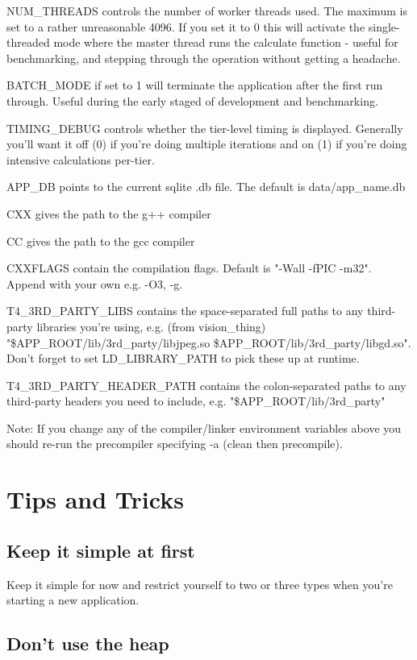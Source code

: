 \documentclass{report}
\begin{document}
NUM_THREADS controls the number of worker threads used. The maximum is set to a rather unreasonable 4096. If you set it to 0 this will activate the single-threaded mode where the master thread runs the calculate function - useful for benchmarking, and stepping through the operation without getting a headache.

BATCH_MODE if set to 1 will terminate the application after the first run through. Useful during the early staged of development and benchmarking.

TIMING_DEBUG controls whether the tier-level timing is displayed. Generally you'll want it off  (0) if you're doing multiple iterations and on (1) if you're doing intensive calculations per-tier.

APP_DB points to the current sqlite .db file. The default is data/app_name.db

CXX gives the path to the g++ compiler

CC gives the path to the gcc compiler

CXXFLAGS contain the compilation flags. Default is "-Wall -fPIC -m32". Append with your own e.g. -O3, -g.

T4_3RD_PARTY_LIBS contains the space-separated full paths to any third-party libraries you're using, e.g. (from vision_thing) "\$APP_ROOT/lib/3rd_party/libjpeg.so \$APP_ROOT/lib/3rd_party/libgd.so". Don't forget to set LD_LIBRARY_PATH to pick these up at runtime.

T4_3RD_PARTY_HEADER_PATH contains the colon-separated paths to any third-party headers you need to include, e.g. "\$APP_ROOT/lib/3rd_party"

Note: If you change any of the compiler/linker environment variables above you should re-run the precompiler specifying -a (clean then precompile).

\section{Tips and Tricks}

\subsection{Keep it simple at first}

Keep it simple for now and restrict yourself to two or three types when you're starting a new application.

\subsection{Don't use the heap}
\end{document}
